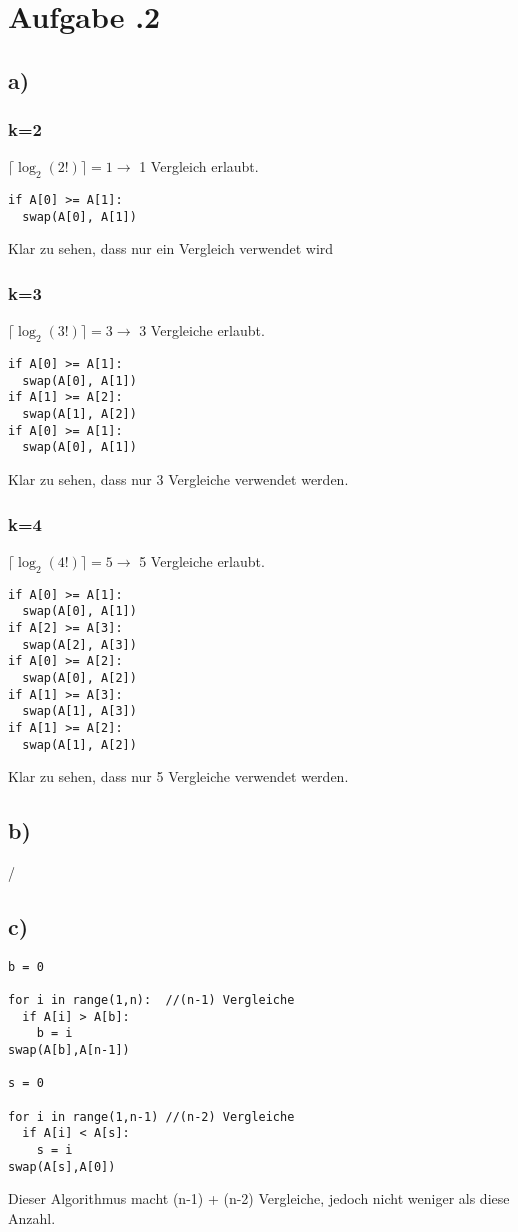 \newpage
\section*{Aufgabe \bn.2}
\subsection*{a)}
\subsubsection*{k=2}
$ \lceil\log_{2}(2!)\rceil = 1 \rightarrow $ 1 Vergleich erlaubt.
\begin{Verbatim}[frame=single]
if A[0] >= A[1]:
  swap(A[0], A[1])
\end{Verbatim}
Klar zu sehen, dass nur ein Vergleich verwendet wird
\subsubsection*{k=3}
$ \lceil\log_{2}(3!)\rceil = 3 \rightarrow $ 3 Vergleiche erlaubt.
\begin{Verbatim}[frame=single]
if A[0] >= A[1]:
  swap(A[0], A[1])
if A[1] >= A[2]:
  swap(A[1], A[2])
if A[0] >= A[1]:
  swap(A[0], A[1])
\end{Verbatim}
Klar zu sehen, dass nur 3 Vergleiche verwendet werden.
\subsubsection*{k=4}
$ \lceil\log_{2}(4!)\rceil = 5 \rightarrow $ 5 Vergleiche erlaubt.
\begin{Verbatim}[frame=single]
if A[0] >= A[1]:
  swap(A[0], A[1])
if A[2] >= A[3]:
  swap(A[2], A[3])
if A[0] >= A[2]:
  swap(A[0], A[2])
if A[1] >= A[3]:
  swap(A[1], A[3])
if A[1] >= A[2]:
  swap(A[1], A[2])
\end{Verbatim}
Klar zu sehen, dass nur 5 Vergleiche verwendet werden.
\subsection*{b)}
/
\subsection*{c)}
\begin{Verbatim}[frame=single]
b = 0

for i in range(1,n):  //(n-1) Vergleiche
  if A[i] > A[b]:
    b = i
swap(A[b],A[n-1])

s = 0

for i in range(1,n-1) //(n-2) Vergleiche
  if A[i] < A[s]:
    s = i
swap(A[s],A[0])
\end{Verbatim}
Dieser Algorithmus macht (n-1) + (n-2) Vergleiche, jedoch nicht weniger als diese Anzahl.